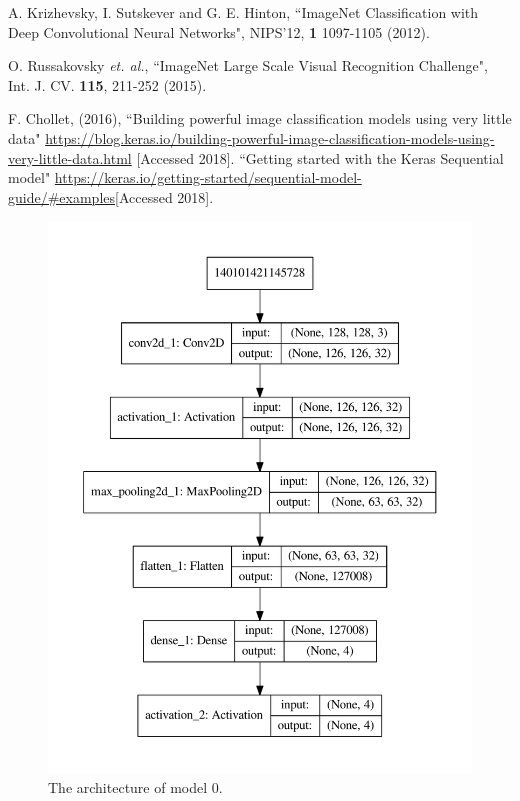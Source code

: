 \documentclass[10pt,a4paper]{article}
\begin{document}
\begin{thebibliography}{9}

 A. Krizhevsky, I. Sutskever and G. E. Hinton, ``ImageNet Classification with Deep Convolutional Neural Networks", NIPS'12, {\bf 1} 1097-1105 (2012).

 O. Russakovsky {\it et. al.}, ``ImageNet Large Scale Visual Recognition Challenge", Int. J. CV. {\bf 115}, 211-252 (2015).

F. Chollet, (2016), ``Building powerful image classification models using very little data" \url{https://blog.keras.io/building-powerful-image-classification-models-using-very-little-data.html} [Accessed 2018].
 ``Getting started with the Keras Sequential model" \url{https://keras.io/getting-started/sequential-model-guide/#examples}[Accessed 2018].


\end{thebibliography}

\newpage
\begin{figure}[h]
\centering
\includegraphics[scale=0.5]{model0_plot.pdf}
\caption{The architecture of model 0.}
\label{fig: model0}
\end{figure}
\end{document}
